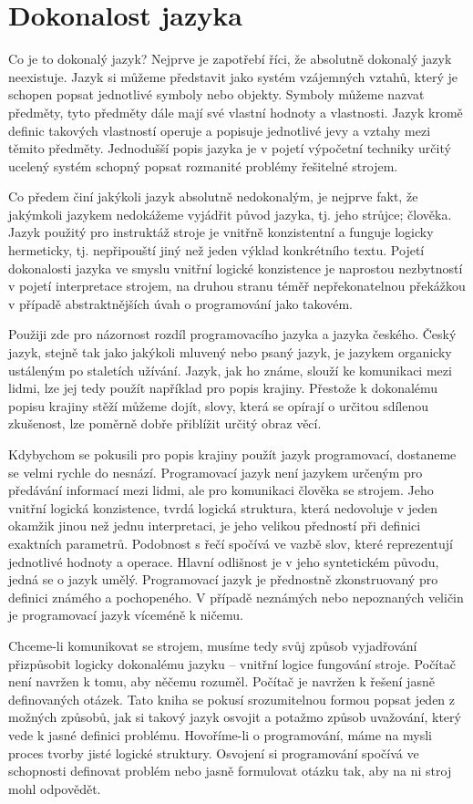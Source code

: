 \documentclass[10pt]{book}
\newcommand{\oddil}[1]{\section{#1}\index{#1}\label{#1}}
\begin{document}
\oddil{Dokonalost jazyka}

Co je to dokonalý jazyk? Nejprve je zapotřebí říci, že absolutně dokonalý jazyk neexistuje. Jazyk si můžeme představit jako systém vzájemných vztahů, který je schopen popsat jednotlivé symboly nebo objekty. Symboly můžeme nazvat předměty, tyto předměty dále mají své vlastní hodnoty a vlastnosti. Jazyk kromě definic takových vlastností operuje a popisuje jednotlivé jevy a vztahy mezi těmito předměty. Jednodušší popis jazyka je v pojetí výpočetní techniky určitý ucelený systém schopný popsat rozmanité problémy řešitelné strojem.

Co předem činí jakýkoli jazyk absolutně nedokonalým, je nejprve fakt, že jakýmkoli jazykem nedokážeme vyjádřit původ jazyka, tj. jeho strůjce; člověka. Jazyk použitý pro instruktáž stroje je vnitřně konzistentní a funguje logicky hermeticky, tj. nepřipouští jiný než jeden výklad konkrétního textu. Pojetí dokonalosti jazyka ve smyslu vnitřní logické konzistence je naprostou nezbytností v pojetí interpretace strojem, na druhou stranu téměř nepřekonatelnou překážkou v případě abstraktnějších úvah o programování jako takovém.

Použiji zde pro názornost rozdíl programovacího jazyka a jazyka českého. Český jazyk, stejně tak jako jakýkoli mluvený nebo psaný jazyk, je jazykem organicky ustáleným po staletích užívání. Jazyk, jak ho známe, slouží ke komunikaci mezi lidmi, lze jej tedy použít například pro popis krajiny. Přestože k dokonalému popisu krajiny stěží můžeme dojít, slovy, která se opírají o určitou sdílenou zkušenost, lze poměrně dobře přiblížit určitý obraz věcí.

Kdybychom se pokusili pro popis krajiny použít jazyk programovací, dostaneme se velmi rychle do nesnází. Programovací jazyk není jazykem určeným pro předávání informací mezi lidmi, ale pro komunikaci člověka se strojem. Jeho vnitřní logická konzistence, tvrdá logická struktura, která nedovoluje v jeden okamžik jinou než jednu interpretaci, je jeho velikou předností při definici exaktních parametrů. Podobnost s řečí spočívá ve vazbě slov, které reprezentují jednotlivé hodnoty a operace. Hlavní odlišnost je v jeho syntetickém původu, jedná se o jazyk umělý. Programovací jazyk je přednostně zkonstruovaný pro definici známého a pochopeného. V případě neznámých nebo nepoznaných veličin je programovací jazyk víceméně k ničemu. 

Chceme-li komunikovat se strojem, musíme tedy svůj způsob vyjadřování přizpůsobit logicky dokonalému jazyku -- vnitřní logice fungování stroje. Počítač není navržen k tomu, aby něčemu rozuměl. Počítač je navržen k řešení jasně definovaných otázek. Tato kniha se pokusí srozumitelnou formou popsat jeden z možných způsobů, jak si takový jazyk osvojit a potažmo způsob uvažování, který vede k jasné definici problému. Hovoříme-li o programování, máme na mysli proces tvorby jisté logické struktury. Osvojení si programování spočívá ve schopnosti definovat problém nebo jasně formulovat otázku tak, aby na ni stroj mohl odpovědět.
\end{document}
